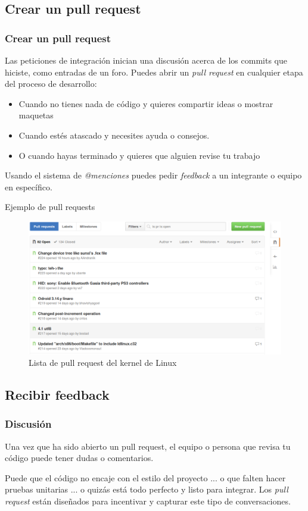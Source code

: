 \documentclass[10pt]{beamer}
\begin{document}
\subsection{Crear un pull request}
\begin{frame}[fragile]
	\frametitle{Crear un pull request}

	Las peticiones de integración inician una discusión acerca de los commits 
	que hiciste, como entradas de un foro. Puedes abrir un \emph{pull request} 
	en cualquier etapa del proceso de desarrollo:
	\begin{itemize}[<+(1)->]
		\item Cuando no tienes nada de código y quieres compartir ideas o 
			mostrar maquetas
		\item Cuando estés atascado y necesites ayuda o consejos.
		\item O cuando hayas terminado y quieres que alguien revise tu trabajo
	\end{itemize}
	\pause
	Usando el sistema de \emph{@menciones} puedes pedir \textit{feedback} a un 
	integrante o equipo en específico.
\end{frame}

\begin{frame}{Ejemplo de pull requests}
	\begin{figure}
		\centering
		\includegraphics[width=\textwidth]{img/pull_requests_linux.png}
		\caption{Lista de pull request del kernel de Linux}
	\end{figure}
\end{frame}

\subsection{Recibir feedback}
\begin{frame}[fragile]
	\frametitle{Discusión}

	Una vez que ha sido abierto un pull request, el equipo o persona que revisa 
	tu código puede tener dudas o comentarios.

	\pause Puede que el código no encaje con el estilo del proyecto \pause... o 
	que falten hacer pruebas unitarias \pause... o quizás está todo perfecto y 
	listo para integrar.
	\pause
	Los \textit{pull request} están diseñados para incentivar y capturar este 
	tipo de conversaciones.
\end{frame}
\end{document}
